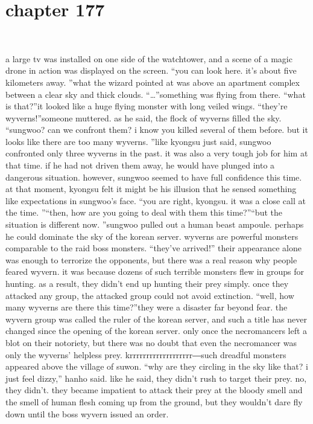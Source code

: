 \section{chapter 177}

                             




a large tv was installed on one side of the watchtower, and a scene of a magic drone in action was displayed on the screen.
“you can look here.
 it’s about five kilometers away.
”what the wizard pointed at was above an apartment complex between a clear sky and thick clouds.
“…”something was flying from there.
“what is that?”it looked like a huge flying monster with long veiled wings.
“they’re wyverns!”someone muttered.
 as he said, the flock of wyverns filled the sky.
“sungwoo? can we confront them? i know you killed several of them before.
 but it looks like there are too many wyverns.
”like kyongsu just said, sungwoo confronted only three wyverns in the past.
 it was also a very tough job for him at that time.
 if he had not driven them away, he would have plunged into a dangerous situation.
however, sungwoo seemed to have full confidence this time.
 at that moment, kyongsu felt it might be his illusion that he sensed something like expectations in sungwoo’s face.
“you are right, kyongsu.
 it was a close call at the time.
”“then, how are you going to deal with them this time?”“but the situation is different now.
”sungwoo pulled out a human beast ampoule.
perhaps he could dominate the sky of the korean server.
wyverns are powerful monsters comparable to the raid boss monsters.
“they’ve arrived!”
their appearance alone was enough to terrorize the opponents, but there was a real reason why people feared wyvern.
 it was because dozens of such terrible monsters flew in groups for hunting.
 as a result, they didn’t end up hunting their prey simply.
 once they attacked any group, the attacked group could not avoid extinction.
“well, how many wyverns are there this time?”they were a disaster far beyond fear.
the wyvern group was called the ruler of the korean server, and such a title has never changed since the opening of the korean server.
only once the necromancers left a blot on their notoriety, but there was no doubt that even the necromancer was only the wyverns’ helpless prey.
krrrrrrrrrrrrrrrrrrr―such dreadful monsters appeared above the village of suwon.
“why are they circling in the sky like that? i just feel dizzy,” hanho said.
like he said, they didn’t rush to target their prey.
 no, they didn’t.
they became impatient to attack their prey at the bloody smell and the smell of human flesh coming up from the ground, but they wouldn’t dare fly down until the boss wyvern issued an order.
